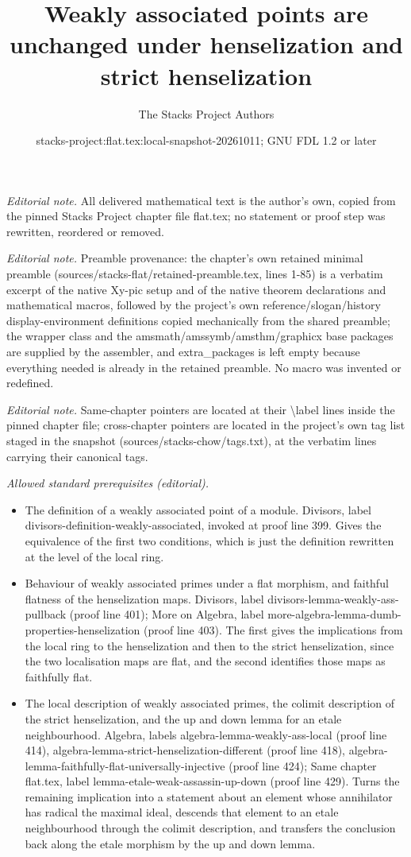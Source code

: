 \documentclass[10pt,a4paper]{amsart}
\title{Weakly associated points are unchanged under henselization and strict henselization}
\author{The Stacks Project Authors}
\date{stacks-project:flat.tex:local-snapshot-20261011; GNU FDL 1.2 or later}
\theoremstyle{plain}
\theoremstyle{definition}
\theoremstyle{remark}
\numberwithin{equation}{subsection}
\begin{document}
\maketitle
\noindent\textit{Editorial note.} All delivered mathematical text is the author's own, copied from the pinned Stacks Project chapter file flat.tex; no statement or proof step was rewritten, reordered or removed.\par\medskip
\noindent\textit{Editorial note.} Preamble provenance: the chapter's own retained minimal preamble (sources/stacks-flat/retained-preamble.tex, lines 1-85) is a verbatim excerpt of the native Xy-pic setup and of the native theorem declarations and mathematical macros, followed by the project's own reference/slogan/history display-environment definitions copied mechanically from the shared preamble; the wrapper class and the amsmath/amssymb/amsthm/graphicx base packages are supplied by the assembler, and extra\_packages is left empty because everything needed is already in the retained preamble. No macro was invented or redefined.\par\medskip
\noindent\textit{Editorial note.} Same-chapter pointers are located at their \textbackslash{}label lines inside the pinned chapter file; cross-chapter pointers are located in the project's own tag list staged in the snapshot (sources/stacks-chow/tags.txt), at the verbatim lines carrying their canonical tags.\par\medskip
\noindent\textit{Allowed standard prerequisites (editorial).}\begin{itemize}
\item The definition of a weakly associated point of a module. Divisors, label divisors-definition-weakly-associated, invoked at proof line 399. Gives the equivalence of the first two conditions, which is just the definition rewritten at the level of the local ring.
\item Behaviour of weakly associated primes under a flat morphism, and faithful flatness of the henselization maps. Divisors, label divisors-lemma-weakly-ass-pullback (proof line 401); More on Algebra, label more-algebra-lemma-dumb-properties-henselization (proof line 403). The first gives the implications from the local ring to the henselization and then to the strict henselization, since the two localisation maps are flat, and the second identifies those maps as faithfully flat.
\item The local description of weakly associated primes, the colimit description of the strict henselization, and the up and down lemma for an etale neighbourhood. Algebra, labels algebra-lemma-weakly-ass-local (proof line 414), algebra-lemma-strict-henselization-different (proof line 418), algebra-lemma-faithfully-flat-universally-injective (proof line 424); Same chapter flat.tex, label lemma-etale-weak-assassin-up-down (proof line 429). Turns the remaining implication into a statement about an element whose annihilator has radical the maximal ideal, descends that element to an etale neighbourhood through the colimit description, and transfers the conclusion back along the etale morphism by the up and down lemma.
\end{itemize}\medskip
\end{document}
